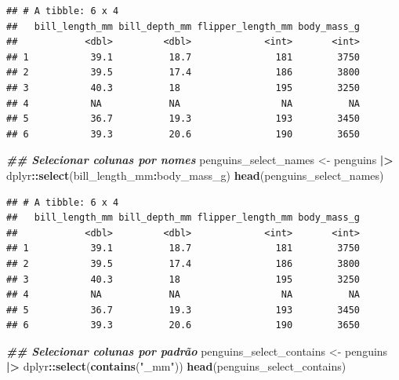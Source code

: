 \documentclass[
]{article}
\newenvironment{Shaded}{\begin{snugshade}}{\end{snugshade}}
\newcommand{\DocumentationTok}[1]{\textcolor[rgb]{0.56,0.35,0.01}{\textbf{\textit{#1}}}}
\newcommand{\FunctionTok}[1]{\textcolor[rgb]{0.13,0.29,0.53}{\textbf{#1}}}
\newcommand{\NormalTok}[1]{#1}
\newcommand{\OtherTok}[1]{\textcolor[rgb]{0.56,0.35,0.01}{#1}}
\newcommand{\SpecialCharTok}[1]{\textcolor[rgb]{0.81,0.36,0.00}{\textbf{#1}}}
\newcommand{\StringTok}[1]{\textcolor[rgb]{0.31,0.60,0.02}{#1}}
\begin{document}
\begin{verbatim}
## # A tibble: 6 x 4
##   bill_length_mm bill_depth_mm flipper_length_mm body_mass_g
##            <dbl>         <dbl>             <int>       <int>
## 1           39.1          18.7               181        3750
## 2           39.5          17.4               186        3800
## 3           40.3          18                 195        3250
## 4           NA            NA                  NA          NA
## 5           36.7          19.3               193        3450
## 6           39.3          20.6               190        3650
\end{verbatim}

\begin{Shaded}
\begin{Highlighting}[]
\DocumentationTok{\#\# Selecionar colunas por nomes}
\NormalTok{penguins\_select\_names }\OtherTok{\textless{}{-}}\NormalTok{ penguins }\SpecialCharTok{|\textgreater{}} 
\NormalTok{    dplyr}\SpecialCharTok{::}\FunctionTok{select}\NormalTok{(bill\_length\_mm}\SpecialCharTok{:}\NormalTok{body\_mass\_g)}
\FunctionTok{head}\NormalTok{(penguins\_select\_names)}
\end{Highlighting}
\end{Shaded}

\begin{verbatim}
## # A tibble: 6 x 4
##   bill_length_mm bill_depth_mm flipper_length_mm body_mass_g
##            <dbl>         <dbl>             <int>       <int>
## 1           39.1          18.7               181        3750
## 2           39.5          17.4               186        3800
## 3           40.3          18                 195        3250
## 4           NA            NA                  NA          NA
## 5           36.7          19.3               193        3450
## 6           39.3          20.6               190        3650
\end{verbatim}

\begin{Shaded}
\begin{Highlighting}[]
\DocumentationTok{\#\# Selecionar colunas por padrão}
\NormalTok{penguins\_select\_contains }\OtherTok{\textless{}{-}}\NormalTok{ penguins }\SpecialCharTok{|\textgreater{}} 
\NormalTok{    dplyr}\SpecialCharTok{::}\FunctionTok{select}\NormalTok{(}\FunctionTok{contains}\NormalTok{(}\StringTok{"\_mm"}\NormalTok{))}
\FunctionTok{head}\NormalTok{(penguins\_select\_contains)}
\end{Highlighting}
\end{Shaded}
\end{document}
